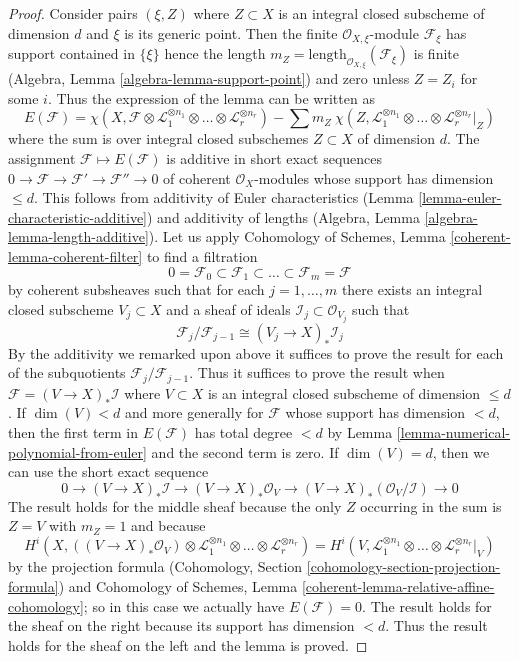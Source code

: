 \begin{proof}
Consider pairs $(\xi , Z)$ where $Z \subset X$ is an integral
closed subscheme of dimension $d$ and $\xi$ is its generic point.
Then the finite $\mathcal{O}_{X, \xi}$-module $\mathcal{F}_\xi$
has support contained in $\{\xi\}$ hence the length
$m_Z = \text{length}_{\mathcal{O}_{X, \xi}}(\mathcal{F}_\xi)$
is finite (Algebra, Lemma \ref{algebra-lemma-support-point})
and zero unless $Z = Z_i$ for some $i$. Thus the expression
of the lemma can be written as
$$
E(\mathcal{F}) =
\chi(X, \mathcal{F} \otimes \mathcal{L}_1^{\otimes n_1} \otimes \ldots \otimes
\mathcal{L}_r^{\otimes n_r}) -
\sum\nolimits
m_Z\ \chi(Z, \mathcal{L}_1^{\otimes n_1} \otimes \ldots \otimes
\mathcal{L}_r^{\otimes n_r}|_Z)
$$
where the sum is over integral closed subschemes $Z \subset X$
of dimension $d$. The assignment $\mathcal{F} \mapsto E(\mathcal{F})$
is additive in short exact sequences
$0 \to \mathcal{F} \to \mathcal{F}' \to \mathcal{F}'' \to 0$
of coherent $\mathcal{O}_X$-modules whose support has dimension
$\leq d$. This follows from additivity of Euler characteristics
(Lemma \ref{lemma-euler-characteristic-additive})
and additivity of lengths
(Algebra, Lemma \ref{algebra-lemma-length-additive}).
Let us apply Cohomology of Schemes, Lemma \ref{coherent-lemma-coherent-filter}
to find a filtration
$$
0 = \mathcal{F}_0 \subset \mathcal{F}_1 \subset
\ldots \subset \mathcal{F}_m = \mathcal{F}
$$
by coherent subsheaves such that for each $j = 1, \ldots, m$
there exists an integral closed subscheme $V_j \subset X$
and a sheaf of ideals $\mathcal{I}_j \subset \mathcal{O}_{V_j}$
such that
$$
\mathcal{F}_j/\mathcal{F}_{j - 1}
\cong (V_j \to X)_* \mathcal{I}_j
$$
By the additivity we remarked upon above it suffices to
prove the result for each of the subquotients
$\mathcal{F}_j/\mathcal{F}_{j - 1}$. Thus it suffices to prove
the result when $\mathcal{F} = (V \to X)_*\mathcal{I}$ where
$V \subset X$ is an integral closed subscheme of dimension $\leq d$.
If $\dim(V) < d$ and more generally for $\mathcal{F}$
whose support has dimension $< d$, then the first term
in $E(\mathcal{F})$ has total degree $< d$ by
Lemma \ref{lemma-numerical-polynomial-from-euler}
and the second term is zero. If $\dim(V) = d$, then we can use the
short exact sequence
$$
0 \to (V \to X)_*\mathcal{I} \to (V \to X)_*\mathcal{O}_V
\to (V \to X)_*(\mathcal{O}_V/\mathcal{I}) \to 0
$$
The result holds for the middle sheaf because
the only $Z$ occurring in the sum is $Z = V$
with $m_Z = 1$ and because
$$
H^i(X, ((V \to X)_*\mathcal{O}_V) \otimes 
 \mathcal{L}_1^{\otimes n_1} \otimes \ldots \otimes
\mathcal{L}_r^{\otimes n_r}) =
H^i(V,  \mathcal{L}_1^{\otimes n_1} \otimes \ldots \otimes
\mathcal{L}_r^{\otimes n_r}|_V)
$$
by the projection formula
(Cohomology, Section \ref{cohomology-section-projection-formula}) and
Cohomology of Schemes, Lemma
\ref{coherent-lemma-relative-affine-cohomology};
so in this case we actually have $E(\mathcal{F}) = 0$.
The result holds for the sheaf on the right because its support
has dimension $< d$. Thus the result holds for the sheaf on the
left and the lemma is proved.
\end{proof}


